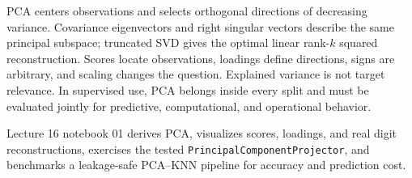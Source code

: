 \begin{chapterreview}
PCA centers observations and selects orthogonal directions of decreasing
variance. Covariance eigenvectors and right singular vectors describe the same
principal subspace; truncated SVD gives the optimal linear rank-$k$ squared
reconstruction. Scores locate observations, loadings define directions, signs
are arbitrary, and scaling changes the question. Explained variance is not
target relevance. In supervised use, PCA belongs inside every split and must be
evaluated jointly for predictive, computational, and operational behavior.
\end{chapterreview}

\begin{notebooklink}
Lecture 16 notebook 01 derives PCA, visualizes scores, loadings, and real digit
reconstructions, exercises the tested \texttt{PrincipalComponentProjector}, and
benchmarks a leakage-safe PCA--KNN pipeline for accuracy and prediction cost.
\end{notebooklink}
